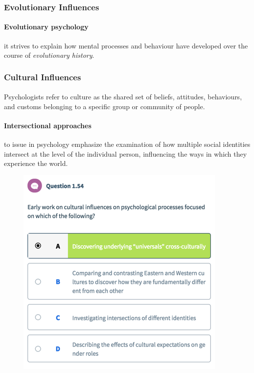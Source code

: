 \documentclass{article}
\begin{document}
 	\subsubsection{Evolutionary Influences}
 	\paragraph{Evolutionary psychology} it strives to explain how mental processes and behaviour have developed over the course of \emph{evolutionary history}.
 	\subsubsection{Cultural Influences}
 	\paragraph{}Psychologists refer to culture as the shared set of beliefs, attitudes, behaviours, and customs belonging to a specific group or community of people.
 	\paragraph{Intersectional approaches} to issue in psychology emphasize the examination of how multiple social identities intersect at the level of the individual person, influencing the ways in which they experience the world.
 	\begin{figure}[H]
 		\centering
 		\includegraphics{psy100/0154}	
 	\end{figure}
\end{document}

